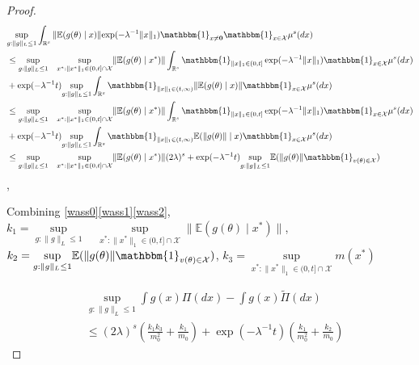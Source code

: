 \documentclass[10pt,fleqn]{article}
\DeclareMathOperator{\1}{\mathbbm{1}}
\begin{document}
\begin{proof}[Proof]
\begin{equation}
\label{wass2}
\begin{aligned}
& \underset{g:\|g\|_L\le 1}\sup\int_{\mathbb{R}^{s}}  \mathbb{\| E}(g(\theta) \mid x)\|{ \exp(- \lambda^{-1} \| x\|_1)}   
\mathbbm{1}_{x \neq \bf 0} \mathbbm{1}_{x\in
\mathcal X}\mu^{s}(d x) \\
&\le \underset{g:\|g\|_L\le 1} \sup\quad \underset{x^{*}:\|x^{*}\|_1\in(0,t]\cap
\mathcal X}\sup \|\mathbb{E}(g(\theta) \mid x^*)\|     
\int_{\mathbb{R}^{s}}\mathbbm{1}_{\|x\|_1\in(0,t]}\exp(- \lambda^{-1} \| x \|_1)\mathbbm{1}_{x\in
\mathcal X}\mu^{s}(d x) \\ & + \exp(- \lambda^{-1} t ) \underset{g:\|g\|_L\le 1}\sup \int_{\mathbb{R}^{s}}   \mathbbm{1}_{\|x\|_1\in(t,\infty)}\|\mathbb{E}( g(\theta )\mid x)\| \mathbbm{1}_{x\in
\mathcal X}\mu^{s}(d x) \\
&\le \underset{g:\|g\|_L\le 1}\sup \quad \underset{x^{*}:\|x^{*}\|_1\in(0,t]\cap
\mathcal X}\sup \|\mathbb{E}(g(\theta) \mid x^*)\|     
\int_{\mathbb{R}^{s}}\mathbbm{1}_{\|x\|_1\in(0,t]}\exp(- \lambda^{-1} \| x \|_1) \mathbbm{1}_{x\in
\mathcal X}\mu^{s}(d x) \\ & + \exp(- \lambda^{-1} t ) \underset{g:\|g\|_L\le 1}\sup \int_{\mathbb{R}^{s}}   \mathbbm{1}_{\|x\|_1\in(t,\infty)}\mathbb{E}(\| g(\theta )\|\mid x) \mathbbm{1}_{x\in
\mathcal X}\mu^{s}(d x) \\
&\le \underset{g:\|g\|_L\le 1}\sup \quad\underset{x^{*}:\|x^{*}\|_1\in(0,t]\cap
\mathcal X}\sup\|\mathbb{E}(g(\theta) \mid x^*)\| (2\lambda)^s + \exp(- \lambda^{-1} t ) \underset{g:\|g\|_L\le 1} \sup \mathbb{E}(\| g(\theta )\| \mathbbm{1}_{v(\theta)\in
\mathcal X}) \\
\end{aligned}
\end{equation},

Combining \eqref{wass0}\eqref{wass1}\eqref{wass2}, $k_1= \underset{g:\|g\|_L\le 1}\sup \quad \underset{x^{*}:\|x^{*}\|_1\in(0,t]\cap
\mathcal X}\sup\|\mathbb{E}(g(\theta) \mid x^*)\|$, $k_2=\underset{g:\|g\|_L\le 1} \sup \mathbb{E}(\| g(\theta )\| \mathbbm{1}_{v(\theta)\in
\mathcal X}) $, $k_3= \underset{x^{*}:\|x^{*}\|_1\in(0,t]\cap
\mathcal X}\sup m(x^{*})  $


\begin{equation}
\begin{aligned}
& \underset{g:\|g\|_L\le 1}\sup \int g(x) \Pi(dx) -  \int g(x) \tilde\Pi(dx) \\
        & \le (2\lambda)^{s} (\frac{k_1 k_3}{m_0^2} + \frac{k_1}{m_0}) + \exp(- \lambda^{-1} t )(\frac{k_1}{m_0^2} + \frac{k_2}{m_0})
        \end{aligned}
        \end{equation}


        \end{proof}
\end{document}
